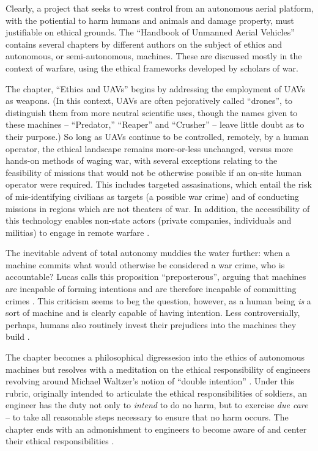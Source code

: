 Clearly, a project that seeks to wrest control from an autonomous aerial platform, with the potiential to harm humans and animals and damage property, must justifiable on ethical grounds. The ``Handbook of Unmanned Aerial Vehicles'' \cite{Valavanis2015j} contains several chapters by different authors on the subject of ethics and autonomous, or semi-autonomous, machines. These are discussed mostly in the context of warfare, using the ethical frameworks developed by scholars of war.

The chapter, ``Ethics and UAVs'' \cite{Valavanis2015bz} begins by addressing the employment of UAVs as weapons. (In this context, UAVs are often pejoratively called ``drones'', to distinguish them from more neutral scientific uses, though the names given to these machines -- ``Predator,'' ``Reaper'' and ``Crusher'' \cite{Lucas2011} -- leave little doubt as to their purpose.) So long as UAVs continue to be controlled, remotely, by a human operator, the ethical landscape remains more-or-less unchanged, versus more hands-on methods of waging war, with several exceptions relating to the feasibility of missions that would not be otherwise possible if an on-site human operator were required. This includes targeted assasinations, which entail the risk of mis-identifying civilians as targets (a possible war crime) and of conducting missions in regions which are not theaters of war. In addition, the accessibility of this technology enables non-state actors (private companies, individuals and militias) to engage in remote warfare \cite[p.2867]{Valavanis2015bz}. 

The inevitable advent of total autonomy muddies the water further: when a machine commits what would otherwise be considered a war crime, who is accountable? Lucas calls this proposition ``preposterous'', arguing that machines are incapable of forming intentions and are therefore incapable of committing crimes \cite[p.2868]{Valavanis2015bz}. This criticism seems to beg the question, however, as a human being \emph{is} a sort of machine and is clearly capable of having intention. Less controversially, perhaps, humans also routinely invest their prejudices into the machines they build \cite{Greenwald1998,Caliskan2017}. 

The chapter becomes a philosophical digressesion into the ethics of autonomous machines but resolves with a meditation on the ethical responsibility of engineers \cite[p.2873]{Valavanis2015bz} revolving around Michael Waltzer's notion of ``double intention'' \cite{Waltzer}. Under this rubric, originally intended to articulate the ethical responsibilities of soldiers, an engineer has the duty not only to \emph{intend} to do no harm, but to exercise \emph{due care} \cite{Lucas2011} -- to take all reasonable steps necessary to ensure that no harm occurs. The chapter ends with an admonishment to engineers to become aware of and center their ethical responsibilities \cite[p.2974]{Valavanis2015bz}.


\setlength{\unitlength}{\savedunitlength}
